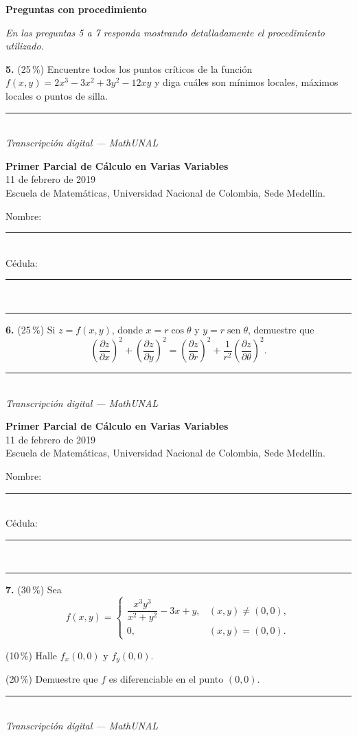\documentclass[11pt]{article}
\newcommand{\examheader}{%
  \noindent
  \begin{minipage}[t]{0.62\linewidth}
    {\bfseries\large Primer Parcial de C\'alculo en Varias Variables}\\
    {\small 11 de febrero de 2019}\\
    {\small Escuela de Matem\'aticas, Universidad Nacional de Colombia, Sede Medell\'in.}
  \end{minipage}%
  \hfill
  \begin{minipage}[t]{0.33\linewidth}
    \raggedleft\small
    Nombre: \rule{2.8cm}{0.4pt}\\[4pt]
    C\'edula: \rule{2.8cm}{0.4pt}
  \end{minipage}\\[4pt]
  \rule{\linewidth}{0.6pt}
}
\newcommand{\examfooter}{%
  \vfill
  \rule{\linewidth}{0.4pt}\\[1pt]
  {\scriptsize\textit{Transcripci\'on digital --- MathUNAL}\hfill\textcolor{unalblue}{\textbf{\thepage}}}
}
\begin{document}
\textbf{Preguntas con procedimiento}

\textit{En las preguntas 5 a 7 responda mostrando detalladamente el procedimiento utilizado.}

\bigskip
\noindent\textbf{5.} (25\,\%) Encuentre todos los puntos cr\'iticos de la funci\'on $f(x,y)=2x^3-3x^2+3y^2-12xy$ y diga cu\'ales son m\'inimos locales, m\'aximos locales o puntos de silla.

\vfill
\examfooter
\newpage
\examheader
\vspace{2pt}

\noindent\textbf{6.} (25\,\%) Si $z=f(x,y)$, donde $x=r\cos\theta$ y $y=r\operatorname{sen}\theta$, demuestre que
$$\left(\frac{\partial z}{\partial x}\right)^2 + \left(\frac{\partial z}{\partial y}\right)^2 = \left(\frac{\partial z}{\partial r}\right)^2 + \frac{1}{r^2}\left(\frac{\partial z}{\partial \theta}\right)^2.$$

\vfill
\examfooter
\newpage
\examheader
\vspace{2pt}

\noindent\textbf{7.} (30\,\%) Sea
$$
f(x,y)=
\begin{cases}
\dfrac{x^3y^3}{x^2+y^2} - 3x+y, & (x,y)\neq (0,0),\\[6pt]
0, & (x,y)=(0,0).
\end{cases}
$$

\begin{opciones}
  \item[(a)] (10\,\%) Halle $f_x(0,0)$ y $f_y(0,0)$.
  \item[(b)] (20\,\%) Demuestre que $f$ es diferenciable en el punto $(0,0)$.
\end{opciones}

\vfill
\examfooter
\end{document}
